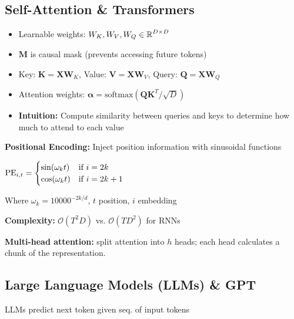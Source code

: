 
\subsection{Self-Attention \& Transformers}


\begin{itemize}
    \item Learnable weights: $W_K, W_V, W_Q \in \operatorname{\mathbb{R}}^{D \times D}$
    \item $\mathbf{M}$ is causal mask (prevents accessing future tokens)
    \item \small Key: $\mathbf{K} = \mathbf{X}\mathbf{W}_K$, Value: $\mathbf{V} = \mathbf{X}\mathbf{W}_V$, Query: $\mathbf{Q} = \mathbf{X}\mathbf{W}_Q$
    \item Attention weights: $\boldsymbol{\alpha} = \text{softmax}(\mathbf{Q}\mathbf{K}^T / \sqrt{D})$
    \item \textbf{Intuition:} Compute similarity between queries and keys to determine how much to attend to each value
\end{itemize}

\textbf{Positional Encoding:} Inject position information with sinusoidal functions

$\text{PE}_{i,t} = \begin{cases} \small
\sin(\omega_k t) & \text{if } i = 2k \\
\cos(\omega_k t) & \text{if } i = 2k+1
\end{cases}$

Where $\omega_k = 10000^{-2k/d}$, $t$ position, $i$ embedding

\textbf{Complexity:} $\mathcal{O}(T^2 D)$ vs. $\mathcal{O}(TD^2)$ for RNNs

\textbf{Multi-head attention:} split attention into $h$ heads; each head calculates a chunk of the representation. 

\subsection{Large Language Models (LLMs) \& GPT}

LLMs predict next token given seq. of input tokens

